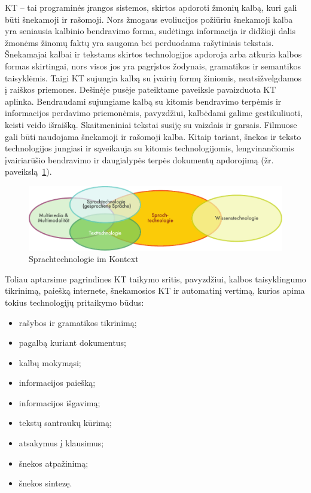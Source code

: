 \documentclass[]{../metanetpaper}
\begin{document}

\begin{multicols}{2}

KT – tai programinės įrangos sistemos, skirtos apdoroti žmonių kalbą, kuri gali būti šnekamoji ir rašomoji. Nors žmogaus evoliucijos požiūriu šnekamoji kalba yra seniausia kalbinio bendravimo forma, sudėtinga informacija ir didžioji dalis žmonėms žinomų faktų yra saugoma bei perduodama rašytiniais tekstais. Šnekamajai kalbai ir tekstams skirtos technologijos apdoroja arba atkuria kalbos formas skirtingai, nors visos jos yra pagrįstos žodynais, gramatikos ir semantikos taisyklėmis. Taigi KT sujungia kalbą su įvairių formų žiniomis, neatsižvelgdamos į raiškos priemones. Dešinėje pusėje pateiktame paveiksle pavaizduota KT aplinka. Bendraudami sujungiame kalbą su kitomis bendravimo terpėmis ir informacijos perdavimo priemonėmis, pavyzdžiui, kalbėdami galime gestikuliuoti, keisti veido išraišką. Skaitmeniniai tekstai susiję su  vaizdais ir garsais. Filmuose gali būti naudojama šnekamoji ir rašomoji kalba. Kitaip tariant, šnekos ir teksto technologijos jungiasi ir sąveikauja su kitomis technologijomis, lengvinančiomis įvairiarūšio bendravimo ir daugialypės terpės dokumentų apdorojimą (žr. paveikslą~\ref{fig:ltincontext_de}).

\begin{figure}[htb]
  \center
  \includegraphics[width=\textwidth]{../_media/german/language_technologies}
  \caption{Sprachtechnologie im Kontext}
  \label{fig:ltincontext_de}
\end{figure}

Toliau aptarsime pagrindines KT taikymo sritis, pavyzdžiui, kalbos taisyklingumo tikrinimą, paiešką internete, šnekamosios KT ir automatinį vertimą, kurios apima tokius technologijų pritaikymo būdus:

\begin{itemize}
\item  rašybos ir gramatikos tikrinimą;
\item pagalbą kuriant dokumentus;
\item kalbų mokymąsi;
\item  informacijos paiešką;
\item  informacijos išgavimą;
\item tekstų santraukų kūrimą;
\item atsakymus į klausimus;
\item šnekos atpažinimą; 
\item  šnekos sintezę.
\end{itemize}


\end{multicols}
\end{document}
